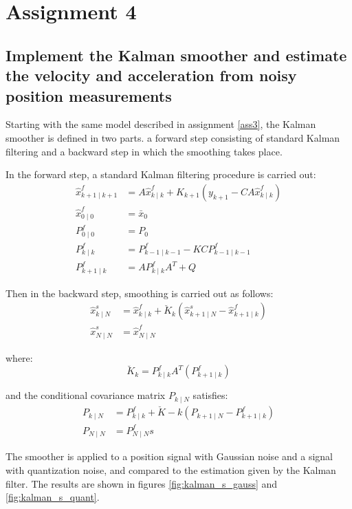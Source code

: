 \section{Assignment 4}

\subsection{Implement the Kalman smoother and estimate the velocity and acceleration from noisy position measurements}

Starting with the same model described in assignment \ref{ass3}, the Kalman smoother is defined in two parts. a forward step consisting of standard Kalman filtering and a backward step in which the smoothing takes place.

In the forward step, a standard Kalman filtering procedure is carried out:
\begin{align*}
\hat x_{k+1\mid k+1}^f &= A\hat x_{k\mid k}^f +K_{k+1}(y_{k+1}-CA\hat x_{k\mid k}^f)\\
\hat x_{0\mid 0}^f&=\bar x_0\\
P_{0\mid 0}^f &= P_0\\
P_{k\mid k}^f &= P_{k-1\mid k-1}^f - KCP_{k-1\mid k-1}^f\\
P_{k+1\mid k}^f &= AP_{k\mid k}^fA^T + Q 
\end{align*}

Then in the backward step, smoothing is carried out as follows:
\begin{align*}
\hat x_{k\mid N}^s&=\hat x_{k\mid k}^f+\breve K_k(\hat x_{k+1\mid N}^s-\hat x_{k+1\mid k}^f)\\
\hat x_{N\mid N}^s&=\hat x_{N\mid N}^f
\end{align*}

where:
\begin{equation*}
\breve K_k = P_{k\mid k}^fA^T(P_{k+1\mid k}^f)
\end{equation*}

and the conditional covariance matrix $P_{k\mid N}$ satisfies:
\begin{align*}
P_{k\mid N}&=P_{k\mid k}^f+\breve K-k(P_{k+1\mid N}-P_{k+1\mid k}^f)\\
P_{N\mid N} &= P_{N\mid N}^fs
\end{align*}

The smoother is applied to a position signal with Gaussian noise and a signal with quantization noise, and compared to the estimation given by the Kalman filter. The results are shown in figures \ref{fig:kalman_s_gauss} and \ref{fig:kalman_s_quant}.


